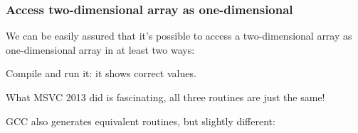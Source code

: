 ﻿\subsubsection{Access two-dimensional array as one-dimensional}

We can be easily assured that it's possible to access a two-dimensional array as one-dimensional array in at least two ways:



Compile and run it: it shows correct values.

What MSVC 2013 did is fascinating, all three routines are just the same!



GCC also generates equivalent routines, but slightly different:



